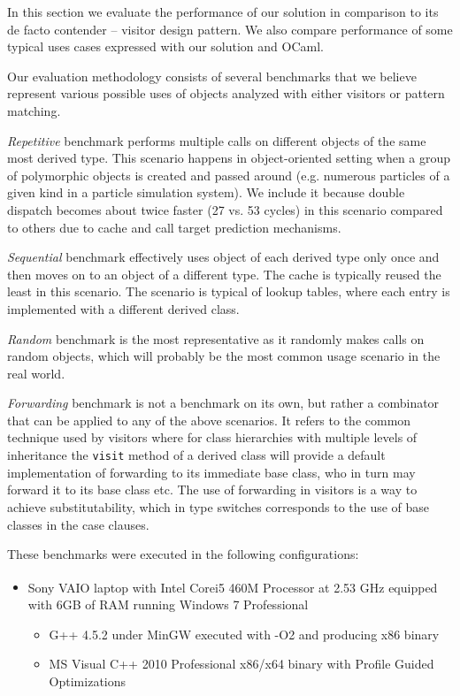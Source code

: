 \documentclass[preprint]{sigplanconf}
\makeatletter
\DeclareRobustCommand{\code}[1]{{\lstinline[breaklines=false,escapechar=@]{#1}}}
\makeatother
\begin{document}
In this section we evaluate the performance of our solution in comparison to its 
de facto contender -- visitor design pattern. We also compare performance of 
some typical uses cases expressed with our solution and OCaml.

Our evaluation methodology consists of several benchmarks that we believe 
represent various possible uses of objects analyzed with either visitors or 
pattern matching.

\emph{Repetitive} benchmark performs multiple calls on different objects of the 
same most derived type. This scenario happens in object-oriented setting when a 
group of polymorphic objects is created and passed around (e.g. numerous 
particles of a given kind in a particle simulation system). We include it 
because double dispatch becomes about twice faster (27 vs. 53 cycles) in this 
scenario compared to others due to cache and call target prediction mechanisms. 

\emph{Sequential} benchmark effectively uses object of each derived type only 
once and then moves on to an object of a different type. The cache is typically 
reused the least in this scenario. The scenario is typical of lookup tables, 
where each entry is implemented with a different derived class.

\emph{Random} benchmark is the most representative as it randomly makes calls on 
random objects, which will probably be the most common usage scenario in the 
real world.

\emph{Forwarding} benchmark is not a benchmark on its own, but rather a 
combinator that can be applied to any of the above scenarios. It refers to the 
common technique used by visitors where for class hierarchies with multiple 
levels of inheritance the \code{visit} method of a derived class will provide a 
default implementation of forwarding to its immediate base class, who in turn 
may forward it to its base class etc. The use of forwarding in visitors is a 
way to achieve substitutability, which in type switches corresponds to the use 
of base classes in the case clauses.

These benchmarks were executed in the following configurations:

\begin{itemize}
\setlength{\itemsep}{0pt}
\setlength{\parskip}{0pt}
\item Sony VAIO\textsuperscript{\textregistered} laptop with Intel\textsuperscript{\textregistered} Core\texttrademark i5 460M 
      Processor at 2.53 GHz equipped with 6GB of RAM running Windows 7 
      Professional
      \begin{itemize}
      \setlength{\itemsep}{0pt}
      \setlength{\parskip}{0pt}
      \item G++ 4.5.2 under MinGW executed with -O2 and producing x86 binary
      \item MS Visual C++ 2010 Professional x86/x64 binary with Profile Guided Optimizations
      \end{itemize}
\end{itemize}
\end{document}
